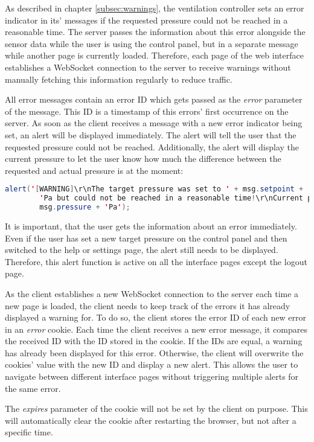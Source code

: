 As described in chapter \ref{subsec:warnings}, the ventilation controller sets an error indicator in its' messages if the requested pressure could not be reached in a reasonable time. The server passes the information about this error alongside the sensor data while the user is using the control panel, but in a separate message while another page is currently loaded. Therefore, each page of the web interface establishes a WebSocket connection to the server to receive warnings without manually fetching this information regularly to reduce traffic.

All error messages contain an error ID which gets passed as the \textit{error} parameter of the message. This ID is a timestamp of this errors' first occurrence on the server. As soon as the client receives a message with a new error indicator being set, an alert will be displayed immediately.  The alert will tell the user that the requested pressure could not be reached. Additionally, the alert will display the current pressure to let the user know how much the difference between the requested and actual pressure is at the moment:

\begin{lstlisting}[label = lst:log_users, language = Java, numbers = none]
 alert('[WARNING]\r\nThe target pressure was set to ' + msg.setpoint + 
 		'Pa but could not be reached in a reasonable time!\r\nCurrent pressure: ' + 
 		msg.pressure + 'Pa');
\end{lstlisting}

It is important, that the user gets the information about an error immediately. Even if the user has set a new target pressure on the control panel and then switched to the help or settings page, the alert still needs to be displayed. Therefore, this alert function is active on all the interface pages except the logout page.

As the client establishes a new WebSocket connection to the server each time a new page is loaded, the client needs to keep track of the errors it has already displayed a warning for. To do so, the client stores the error ID of each new error in an \textit{error} cookie. Each time the client receives a new error message, it compares the received ID with the ID stored in the cookie. If the IDs are equal, a warning has already been displayed for this error. Otherwise, the client will overwrite the cookies' value with the new ID and display a new alert. This allows the user to navigate between different interface pages without triggering multiple alerts for the same error.

The \textit{expires} parameter of the cookie will not be set by the client on purpose. This will automatically clear the cookie after restarting the browser, but not after a specific time.






